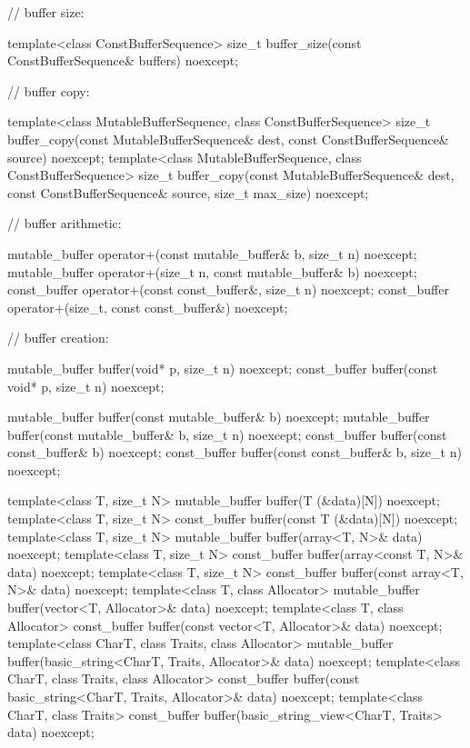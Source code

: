 \begin{codeblock}
{{{{  // buffer size:

  template<class ConstBufferSequence>
    size_t buffer_size(const ConstBufferSequence& buffers) noexcept;

  // buffer copy:

  template<class MutableBufferSequence, class ConstBufferSequence>
    size_t buffer_copy(const MutableBufferSequence& dest,
                       const ConstBufferSequence& source) noexcept;
  template<class MutableBufferSequence, class ConstBufferSequence>
    size_t buffer_copy(const MutableBufferSequence& dest,
                       const ConstBufferSequence& source,
                       size_t max_size) noexcept;

  // buffer arithmetic:

  mutable_buffer operator+(const mutable_buffer& b, size_t n) noexcept;
  mutable_buffer operator+(size_t n, const mutable_buffer& b) noexcept;
  const_buffer operator+(const const_buffer&, size_t n) noexcept;
  const_buffer operator+(size_t, const const_buffer&) noexcept;

  // buffer creation:

  mutable_buffer buffer(void* p, size_t n) noexcept;
  const_buffer buffer(const void* p, size_t n) noexcept;

  mutable_buffer buffer(const mutable_buffer& b) noexcept;
  mutable_buffer buffer(const mutable_buffer& b, size_t n) noexcept;
  const_buffer buffer(const const_buffer& b) noexcept;
  const_buffer buffer(const const_buffer& b, size_t n) noexcept;

  template<class T, size_t N>
    mutable_buffer buffer(T (&data)[N]) noexcept;
  template<class T, size_t N>
    const_buffer buffer(const T (&data)[N]) noexcept;
  template<class T, size_t N>
    mutable_buffer buffer(array<T, N>& data) noexcept;
  template<class T, size_t N>
    const_buffer buffer(array<const T, N>& data) noexcept;
  template<class T, size_t N>
    const_buffer buffer(const array<T, N>& data) noexcept;
  template<class T, class Allocator>
    mutable_buffer buffer(vector<T, Allocator>& data) noexcept;
  template<class T, class Allocator>
    const_buffer buffer(const vector<T, Allocator>& data) noexcept;
  template<class CharT, class Traits, class Allocator>
    mutable_buffer buffer(basic_string<CharT, Traits, Allocator>& data) noexcept;
  template<class CharT, class Traits, class Allocator>
    const_buffer buffer(const basic_string<CharT, Traits, Allocator>& data) noexcept;
  template<class CharT, class Traits>
    const_buffer buffer(basic_string_view<CharT, Traits> data) noexcept;

}}}}
\end{codeblock}
